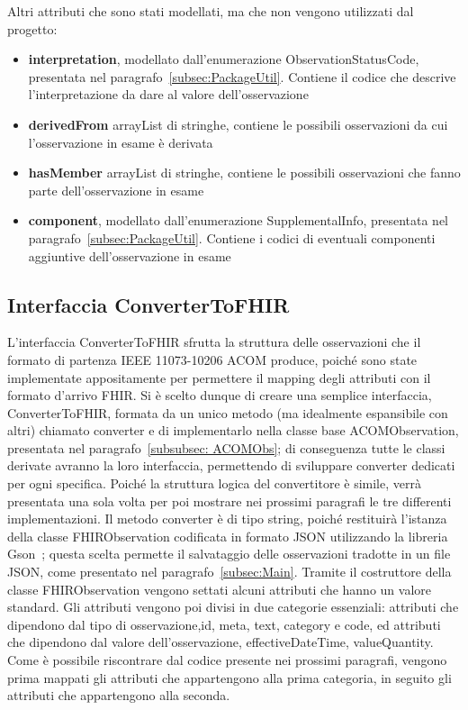 \documentclass[a4paper]{article}
\begin{document}
\begin{itemize}
    Altri attributi che sono stati modellati, ma che non vengono utilizzati dal progetto:
    \begin{itemize}
        \item \textbf{interpretation}, modellato dall'enumerazione ObservationStatusCode, presentata nel paragrafo~\ref{subsec:PackageUtil}. Contiene il codice che descrive l'interpretazione da dare al valore dell'osservazione
        \item \textbf{derivedFrom} arrayList di stringhe, contiene le possibili osservazioni
        da cui l'osservazione in esame è derivata
        \item \textbf{hasMember} arrayList di stringhe, contiene le possibili osservazioni che fanno parte dell'osservazione in esame
        \item \textbf{component}, modellato dall'enumerazione SupplementalInfo, presentata nel paragrafo~\ref{subsec:PackageUtil}. Contiene i codici di eventuali componenti aggiuntive dell'osservazione in esame
    \end{itemize}
\end{itemize}
\subsection{Interfaccia ConverterToFHIR}\label{subsubsec:ConverterToFHIR}
L'interfaccia ConverterToFHIR sfrutta la struttura delle osservazioni che il formato di partenza IEEE 11073-10206 ACOM produce, poiché sono state implementate appositamente per permettere il mapping degli attributi con il formato d'arrivo FHIR.
Si è scelto dunque di creare una semplice interfaccia, ConverterToFHIR, formata da un unico metodo (ma idealmente espansibile con altri) chiamato converter e di implementarlo nella classe base ACOMObservation, presentata nel paragrafo~\ref{subsubsec: ACOMObs}; di conseguenza tutte le classi derivate avranno la loro interfaccia, permettendo di sviluppare converter dedicati per ogni specifica.
Poiché la struttura logica del convertitore è simile, verrà presentata una sola volta per poi mostrare nei prossimi paragrafi le tre differenti implementazioni.
Il metodo converter è di tipo string, poiché restituirà l'istanza della classe FHIRObservation codificata in formato JSON utilizzando la libreria Gson~\cite{GSON}; questa scelta permette il salvataggio delle osservazioni tradotte in un file JSON, come presentato nel paragrafo~\ref{subsec:Main}.
Tramite il costruttore della classe FHIRObservation vengono settati alcuni attributi che hanno un valore standard.
Gli attributi vengono poi divisi in due categorie essenziali: attributi che dipendono dal tipo di osservazione,id, meta, text, category e code, ed attributi che dipendono dal valore dell'osservazione, effectiveDateTime, valueQuantity.
Come è possibile riscontrare dal codice presente nei prossimi paragrafi, vengono prima mappati gli attributi che appartengono alla prima categoria, in seguito gli attributi che appartengono alla seconda.
\end{document}
